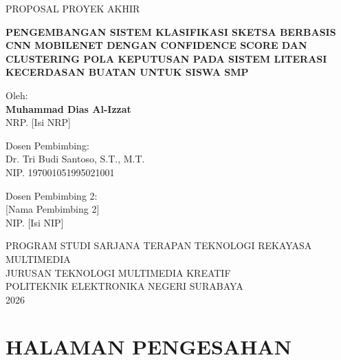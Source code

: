 \documentclass[12pt,oneside]{report}
\begin{document}

\begin{titlepage}
\centering

\vspace*{1cm}

{\large PROPOSAL PROYEK AKHIR}

\vspace{0.5cm}

{\Large\bfseries PENGEMBANGAN SISTEM KLASIFIKASI SKETSA BERBASIS CNN MOBILENET DENGAN CONFIDENCE SCORE DAN CLUSTERING POLA KEPUTUSAN PADA SISTEM LITERASI KECERDASAN BUATAN UNTUK SISWA SMP}

\vspace{2cm}

{\large Oleh:}\\[0.3cm]
{\large\bfseries Muhammad Dias Al-Izzat}\\[0.1cm]
{\large NRP. [Isi NRP]}

\vspace{2cm}

{\large Dosen Pembimbing:}\\[0.3cm]
{\large Dr. Tri Budi Santoso, S.T., M.T.}\\[0.1cm]
{\large NIP. 197001051995021001}

\vspace{0.5cm}

{\large Dosen Pembimbing 2:}\\[0.3cm]
{\large [Nama Pembimbing 2]}\\[0.1cm]
{\large NIP. [Isi NIP]}

\vspace{2cm}

{\large PROGRAM STUDI SARJANA TERAPAN TEKNOLOGI REKAYASA MULTIMEDIA}\\[0.2cm]
{\large JURUSAN TEKNOLOGI MULTIMEDIA KREATIF}\\[0.2cm]
{\large POLITEKNIK ELEKTRONIKA NEGERI SURABAYA}\\[0.2cm]
{\large 2026}

\end{titlepage}


\chapter*{HALAMAN PENGESAHAN}
\end{document}
